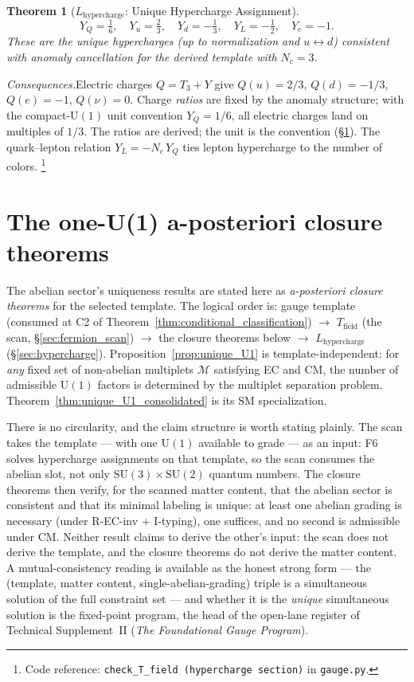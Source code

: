 \documentclass[11pt]{article}
\newtheorem{theorem}{Theorem}[section]
\theoremstyle{definition}
\newcommand{\SU}{\mathrm{SU}}
\newcommand{\U}{\mathrm{U}}
\newcommand{\coderef}[2]{\footnote{Code reference: \texttt{#1} in \texttt{#2}.}}
\newcommand{\TSII}{Technical Supplement~II (\emph{The Foundational Gauge Program})}
\begin{document}
\begin{theorem}[$L_{\mathrm{hypercharge}}$: Unique Hypercharge Assignment]
\label{thm:hypercharge}
\[
  Y_Q = \tfrac{1}{6}, \quad
  Y_u = \tfrac{2}{3}, \quad
  Y_d = -\tfrac{1}{3}, \quad
  Y_L = -\tfrac{1}{2}, \quad
  Y_e = -1.
\]
These are the unique hypercharges (up to normalization and $u \leftrightarrow d$)
consistent with anomaly cancellation for the derived template with $N_c = 3$.
\end{theorem}

\noindent\textit{Consequences.}\quad Electric charges $Q = T_3 + Y$ give
$Q(u) = 2/3$, $Q(d) = -1/3$, $Q(e) = -1$, $Q(\nu) = 0$.  Charge
\emph{ratios} are fixed by the anomaly structure; with the
compact-$\U(1)$ unit convention $Y_Q = 1/6$, all electric charges
land on multiples of $1/3$.  The ratios are derived; the unit is the
convention (\S\ref{sec:one_u1_closure}).  The quark--lepton relation
$Y_L = -N_c\, Y_Q$ ties lepton hypercharge to the number of colors.
\coderef{check\_T\_field (hypercharge section)}{gauge.py}


\newpage




\section{The one-U(1) a-posteriori closure theorems}
\label{sec:one_u1_closure}

The abelian sector's uniqueness results are stated here as
\emph{a-posteriori closure theorems} for the selected template.  The
logical order is: gauge template (consumed at C2 of
Theorem~\ref{thm:conditional_classification}) $\to$
$T_{\mathrm{field}}$ (the scan, \S\ref{sec:fermion_scan}) $\to$ the
closure theorems below $\to$ $L_{\mathrm{hypercharge}}$
(\S\ref{sec:hypercharge}).  Proposition~\ref{prop:unique_U1} is
template-independent: for \emph{any} fixed set of non-abelian
multiplets $\mathcal{M}$ satisfying EC and CM, the number of
admissible $\U(1)$ factors is determined by the multiplet separation
problem.  Theorem~\ref{thm:unique_U1_consolidated} is its SM
specialization.

There is no circularity, and the claim structure is worth stating
plainly.  The scan takes the template --- with one $\U(1)$ available
to grade --- as an input: F6 solves hypercharge assignments on that
template, so the scan consumes the abelian slot, not only
$\SU(3)\times\SU(2)$ quantum numbers.  The closure theorems then
verify, for the scanned matter content, that the abelian sector is
consistent and that its minimal labeling is unique: at least one
abelian grading is necessary (under R-EC-inv $+$ I-typing), one
suffices, and no second is admissible under CM.  Neither result
claims to derive the other's input: the scan does not derive the
template, and the closure theorems do not derive the matter content.
A mutual-consistency reading is available as the honest strong form
--- the (template, matter content, single-abelian-grading) triple is a
simultaneous solution of the full constraint set --- and whether it is
the \emph{unique} simultaneous solution is the fixed-point program,
the head of the open-lane register of \TSII.
\end{document}
